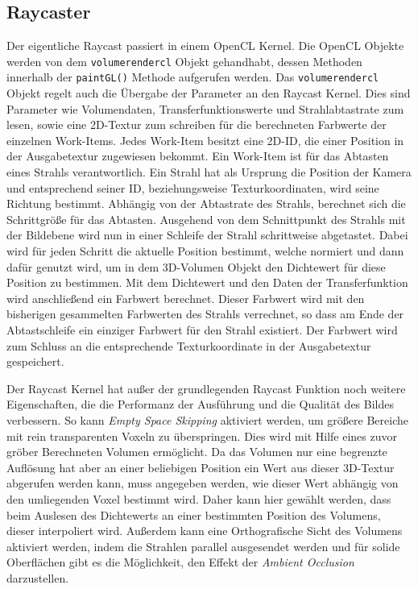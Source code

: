 \subsection*{Raycaster}
Der eigentliche Raycast passiert in einem OpenCL Kernel.
Die OpenCL Objekte werden von dem \texttt{volumerendercl} Objekt gehandhabt, dessen Methoden innerhalb der \texttt{paintGL()} Methode aufgerufen werden.
Das \texttt{volumerendercl} Objekt regelt auch die Übergabe der Parameter an den Raycast Kernel.
Dies sind Parameter wie Volumendaten, Transferfunktionswerte und Strahlabtastrate zum lesen, sowie eine 2D-Textur zum schreiben für die berechneten Farbwerte der einzelnen Work-Items.
Jedes Work-Item besitzt eine 2D-ID, die einer Position in der Ausgabetextur zugewiesen bekommt.
Ein Work-Item ist für das Abtasten eines Strahls verantwortlich.
Ein Strahl hat als Ursprung die Position der Kamera und entsprechend seiner ID, beziehungsweise Texturkoordinaten, wird seine Richtung bestimmt.
Abhängig von der Abtastrate des Strahls, berechnet sich die Schrittgröße für das Abtasten. 
Ausgehend von dem Schnittpunkt des Strahls mit der Bildebene wird nun in einer Schleife der Strahl schrittweise abgetastet.
Dabei wird für jeden Schritt die aktuelle Position bestimmt, welche normiert und dann dafür genutzt wird, um in dem 3D-Volumen Objekt den Dichtewert für diese Position zu bestimmen.
Mit dem Dichtewert und den Daten der Transferfunktion wird anschließend ein Farbwert berechnet.
Dieser Farbwert wird mit den bisherigen gesammelten Farbwerten des Strahls verrechnet, so dass am Ende der Abtastschleife ein einziger Farbwert für den Strahl existiert.
Der Farbwert wird zum Schluss an die entsprechende Texturkoordinate in der Ausgabetextur gespeichert.

Der Raycast Kernel hat außer der grundlegenden Raycast Funktion noch weitere Eigenschaften, die die Performanz der Ausführung und die Qualität des Bildes verbessern.
So kann \emph{Empty Space Skipping} aktiviert werden, um größere Bereiche mit rein transparenten Voxeln zu überspringen.
Dies wird mit Hilfe eines zuvor gröber Berechneten Volumen ermöglicht.
Da das Volumen nur eine begrenzte Auflösung hat aber an einer beliebigen Position ein Wert aus dieser 3D-Textur abgerufen werden kann, muss angegeben werden, wie dieser Wert abhängig von den umliegenden Voxel bestimmt wird.
Daher kann hier gewählt werden, dass beim Auslesen des Dichtewerts an einer bestimmten Position des Volumens, dieser interpoliert wird.
Außerdem kann eine Orthografische Sicht des Volumens aktiviert werden, indem die Strahlen parallel ausgesendet werden und für solide Oberflächen gibt es die Möglichkeit, den Effekt der \emph{Ambient Occlusion} darzustellen.

